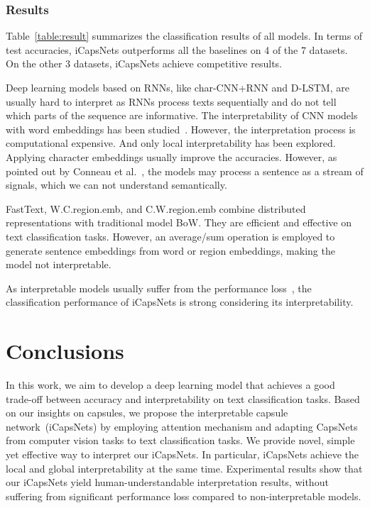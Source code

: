 \documentclass[10pt,journal,compsoc]{IEEEtran}
\begin{document}
\subsubsection{Results}

Table~\ref{table:result} summarizes the classification results of all models. In terms of test accuracies, iCapsNets outperforms all the baselines on 4 of the 7 datasets. On the other 3 datasets, iCapsNets achieve competitive results.

Deep learning models based on RNNs, like char-CNN+RNN and D-LSTM, are usually hard to interpret as RNNs process texts sequentially and do not tell which parts of the sequence are informative. The interpretability of CNN models with word embeddings has been studied~\cite{yuan2019interpreting}. However, the interpretation process is computational expensive. And only local interpretability has been explored. Applying character embeddings usually improve the accuracies. However, as pointed out by Conneau et al.~\cite{conneau2017very}, the models may process a sentence as a stream of signals, which we can not understand semantically.

FastText, W.C.region.emb, and C.W.region.emb combine distributed representations with traditional model BoW. They are efficient and effective on text classification tasks. However, an average/sum operation is employed to generate sentence embeddings from word or region embeddings, making the model not interpretable.

As interpretable models usually suffer from the performance loss~\cite{du2018techniques}, the classification performance of iCapsNets is strong considering its interpretability.

\section{Conclusions}

In this work, we aim to develop a deep learning model that achieves a good trade-off between accuracy and interpretability on text classification tasks. Based on our insights on capsules, we propose the interpretable capsule network~(iCapsNets) by employing attention mechanism and adapting CapsNets~\cite{sabour2017dynamic} from computer vision tasks to text classification tasks. We provide novel, simple yet effective way to interpret our iCapsNets. In particular, iCapsNets achieve the local and global interpretability at the same time. Experimental results show that our iCapsNets yield human-understandable interpretation results, without suffering from significant performance loss compared to non-interpretable models.
\end{document}
